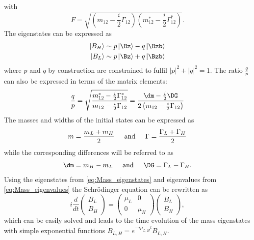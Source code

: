 with
\begin{equation}
F=\sqrt{\left(m_{12}-\frac{i}{2}\Gamma_{12}\right)\left(m_{12}^\ast-\frac{i}{2}\Gamma_{12}^\ast\right)}.
\end{equation}
The eigenstates can be expressed as
\begin{equation}
\begin{split}
\left|B_H\right>&\sim p\left|\Bz\right>-q\left|\Bzb\right>\\
\left|B_L\right>&\sim p\left|\Bz\right>+q\left|\Bzb\right>\label{eq:Mass_eigenstates}
\end{split}
\end{equation}
where $p$ and $q$ by construction are constrained to fulfil $\left|p\right|^2+\left|q\right|^2=1$.
The ratio $\frac{q}{p}$ can also be expressed in terms of the matrix elements:
\begin{equation}
\frac{q}{p}=\sqrt{ \frac{ m_{12}^\ast-\frac{i}{2}\Gamma_{12}^\ast }{ m_{12}-\frac{i}{2}\Gamma_{12} }}
=\frac{\dm-\frac{i}{2}\DG}{2\left(m_{12}-\frac{i}{2}\Gamma_{12}\right)}\label{eq:qoverp}
\end{equation}
The masses and widths of the initial states can be expressed as
\begin{equation}
m=\frac{m_L+m_H}{2}\hspace{0.5cm}\text{and}\hspace{0.5cm}\Gamma=\frac{\Gamma_L+\Gamma_H}{2}
\end{equation}
while the corresponding differences will be referred to as
\begin{equation}
\dm=m_H-m_L\hspace{0.5cm}\text{and}\hspace{0.5cm}\DG=\Gamma_L-\Gamma_H.
\end{equation}
Using the eigenstates from \cref{eq:Mass_eigenstates} and eigenvalues from \cref{eq:Mass_eigenvalues} the Schrödinger equation can be rewritten as
\begin{equation}
i\frac{d}{dt}\begin{pmatrix} B_L \\ B_H \end{pmatrix} = \begin{pmatrix} \mu_L & 0 \\ 0 & \mu_H \end{pmatrix}\begin{pmatrix} B_L \\ B_H \end{pmatrix},
\end{equation}
which can be easily solved and leads to the time evolution of the mass eigenstates with simple exponential functions $B_{L,H}=e^{-i\mu_{L,H}t}B_{L,H}$.
